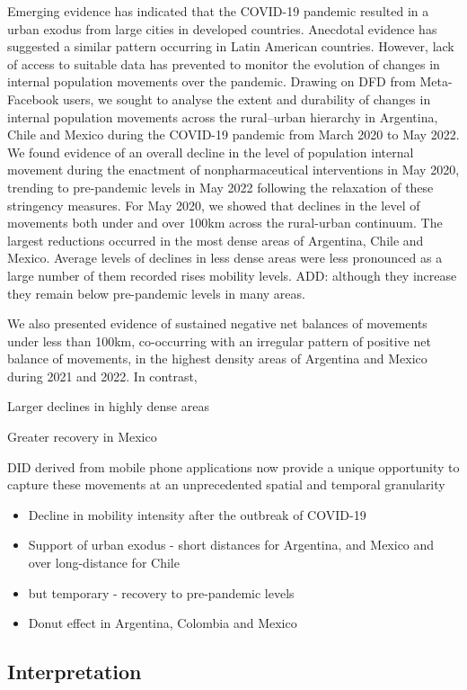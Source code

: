 \documentclass[
  10pt,
  letterpaper,
  DIV=11,
  numbers=noendperiod]{scrartcl}
\begin{document}
Emerging evidence has indicated that the COVID-19 pandemic resulted in a
urban exodus from large cities in developed countries. Anecdotal
evidence has suggested a similar pattern occurring in Latin American
countries. However, lack of access to suitable data has prevented to
monitor the evolution of changes in internal population movements over
the pandemic. Drawing on DFD from Meta-Facebook users, we sought to
analyse the extent and durability of changes in internal population
movements across the rural--urban hierarchy in Argentina, Chile and
Mexico during the COVID-19 pandemic from March 2020 to May 2022. We
found evidence of an overall decline in the level of population internal
movement during the enactment of nonpharmaceutical interventions in May
2020, trending to pre-pandemic levels in May 2022 following the
relaxation of these stringency measures. For May 2020, we showed that
declines in the level of movements both under and over 100km across the
rural-urban continuum. The largest reductions occurred in the most dense
areas of Argentina, Chile and Mexico. Average levels of declines in less
dense areas were less pronounced as a large number of them recorded
rises mobility levels. ADD: although they increase they remain below
pre-pandemic levels in many areas.

We also presented evidence of sustained negative net balances of
movements under less than 100km, co-occurring with an irregular pattern
of positive net balance of movements, in the highest density areas of
Argentina and Mexico during 2021 and 2022. In contrast,

Larger declines in highly dense areas

Greater recovery in Mexico

DID derived from mobile phone applications now provide a unique
opportunity to capture these movements at an unprecedented spatial and
temporal granularity

\begin{itemize}
\item
  Decline in mobility intensity after the outbreak of COVID-19
\item
  Support of urban exodus - short distances for Argentina, and Mexico
  and over long-distance for Chile
\item
  but temporary - recovery to pre-pandemic levels
\item
  Donut effect in Argentina, Colombia and Mexico
\end{itemize}

\hypertarget{interpretation}{%
\subsection{Interpretation}\label{interpretation}}
\end{document}
